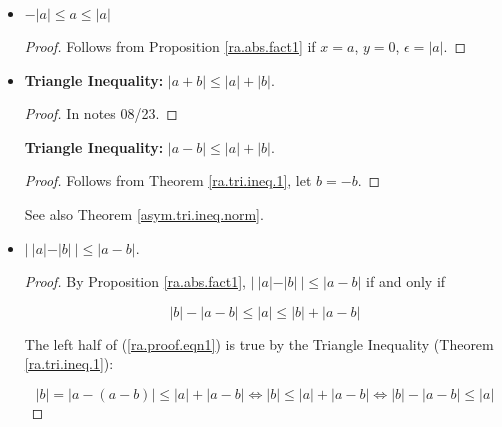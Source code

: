 \begin{itemize}
\begin{proof} Follows from Proposition \ref{ra.abs.fact1} if \(x = a\), \(y = 0\). \end{proof}

\item \begin{proposition} \(-|a| \leq a \leq |a|\)  \end{proposition}

\begin{proof}  Follows from Proposition \ref{ra.abs.fact1} if \(x = a\), \(y = 0\), \(\epsilon = |a|\). \end{proof}

\item \begin{theorem}\label{ra.tri.ineq.1} \textbf{Triangle Inequality:} \(|a + b| \leq |a| + |b|\). \end{theorem}

\begin{proof} In notes 08/23.\end{proof}

 \begin{corollary}\label{ra.tri.ineq.2} \textbf{Triangle Inequality:} \(|a - b| \leq |a| + |b|\). \end{corollary}

\begin{proof} Follows from Theorem \ref{ra.tri.ineq.1}, let \(b = -b\).

\end{proof}

\begin{remark} See also Theorem \ref{asym.tri.ineq.norm}.\end{remark}

\item \begin{proposition} \(|\ |a| - |b| \ | \leq |a - b|\). \end{proposition}

\begin{proof} By Proposition \ref{ra.abs.fact1}, \(|\ |a| - |b| \ | \leq |a - b|\) if and only if

\begin{equation}\label{ra.proof.eqn1}
|b| - |a - b| \leq |a| \leq |b| + |a - b|
\end{equation}

The left half of (\ref{ra.proof.eqn1}) is true by the Triangle Inequality (Theorem \ref{ra.tri.ineq.1}):

\[
|b| = |a - (a - b)| \leq |a| +  |a - b| \iff |b| \leq |a| +  |a - b| \iff  |b| - |a - b| \leq |a|
\]


\end{proof}
\end{itemize}
